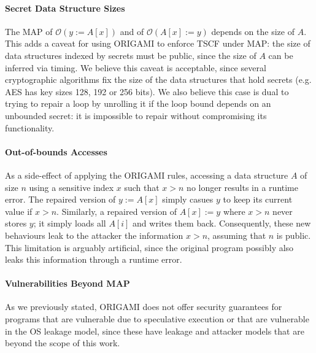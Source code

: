 \paragraph*{Secret Data Structure Sizes} The MAP of $\mathscr{O}(y:=A[x])$ and of $\mathscr{O}(A[x]:=y)$ depends on the size of $A$. This adds a caveat for using ORIGAMI to enforce TSCF under MAP: the size of data structures indexed by secrets must be public, since the size of $A$ can be inferred via timing. We believe this caveat is acceptable, since several cryptographic algorithms fix the size of the data structures that hold secrets (e.g. AES has key sizes 128, 192 or 256 bits). We also believe this case is dual to trying to repair a loop by unrolling it if the loop bound depends on an unbounded secret: it is impossible to repair without compromising its functionality\cite{SCEliminator,MSESC}.

\paragraph*{Out-of-bounds Accesses} As a side-effect of applying the ORIGAMI rules, accessing a data structure $A$ of size $n$ using a sensitive index $x$ such that $x>n$ no longer results in a runtime error. The repaired version of $y:=A[x]$ simply casues $y$ to keep its current value if $x>n$. Similarly, a repaired version of $A[x]:=y$ where $x>n$ never stores $y$; it simply loads all $A[i]$ and writes them back. Consequently, these new behaviours leak to the attacker the information $x>n$, assuming that $n$ is public. This limitation is arguably artificial, since the original program possibly also leaks this information through a runtime error.

\paragraph*{Vulnerabilities Beyond MAP} As we previously stated, ORIGAMI does not offer security guarantees for programs that are vulnerable due to speculative execution or that are vulnerable in the OS leakage model, since these have leakage and attacker models that are beyond the scope of this work.


